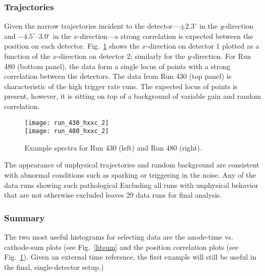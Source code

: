 \subsubsection{Trajectories}
Given the narrow trajectories incident to the detector---$\pm2.3^\circ$ in the $y$-direction and $-4.5^\circ$--3.0$^\circ$ in the $x$-direction---a strong correlation is expected between the position on each detector. Fig.~\ref{hxxc} shows the $x$-direction on detector 1 plotted as a function of the $x$-direction on detector 2; similarly for the $y$-direction. For Run 480 (bottom panel), the data form a single locus of points with a strong correlation between the detectors. The data from Run 430 (top panel) is characteristic of the high trigger rate runs. The expected locus of points is present, however, it is sitting on top of a background of variable gain and random correlation.

\begin{figure}
\centering
\texttt{[image: run\_430\_hxxc\_2]} \\
\texttt{[image: run\_480\_hxxc\_2]} 
\caption{Example  spectra for Run 430 (left) and Run 480 (right). }
\label{hxxc}
\end{figure}

The appearance of unphysical trajectories and random background are consistent with abnormal conditions such as sparking or triggering in the noise. Any of the data runs showing such pathological
Excluding all runs with unphysical behavior that are not otherwise excluded leaves 29 data runs for final analysis. 
\subsubsection{Summary}
The two most useful histograms for selecting data are the anode-time vs. cathode-sum plots (see Fig.~\ref{htsum} and the position correlation plots (see Fig.~\ref{hxxc}). Given an external time reference, the first example will still be useful in the final, single-detector setup.)
